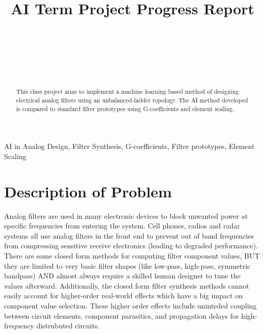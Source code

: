 \documentclass[10pt,conference]{IEEEtran}
\begin{document}
\title{AI Term Project Progress Report\\
 \Large{} }

\author{
\\
\and
\IEEEauthorblockN{---, ---,}
\IEEEauthorblockA{--\\
---\\
---\\
---}\\ }
\vspace{-1in}

\maketitle



\begin{abstract}
This class project aims to implement a machine learning based method of designing electrical analog filters using an unbalanced-ladder topology. The AI method developed is compared to standard filter prototypes using G-coefficients and element scaling.




\end{abstract}
\renewcommand\IEEEkeywordsname{Keywords}
\begin{IEEEkeywords}
AI in Analog Design, Filter Synthesis, G-coefficients, Filter prototypes, Element Scaling
\end{IEEEkeywords}



\section{Description of Problem}


Analog filters are used in many electronic devices to block unwanted power at specific frequencies from entering the system. Cell phones, radios and radar systems all use analog filters in the front end to prevent out of band frequencies from compressing sensitive receive electronics (leading to degraded performance). There are some closed form methods for computing filter component values, BUT they are limited to very basic filter shapes (like low-pass, high-pass, symmetric bandpass) AND almost always require a skilled human designer to tune the values afterward. Additionally, the closed form filter synthesis methods cannot easily account for higher-order real-world effects which have a big impact on component value selection. These higher order effects include uninteded coupling between circuit elements, component parasitics, and propagation delays for high-frequency distrubuted circuits.
\end{document}
